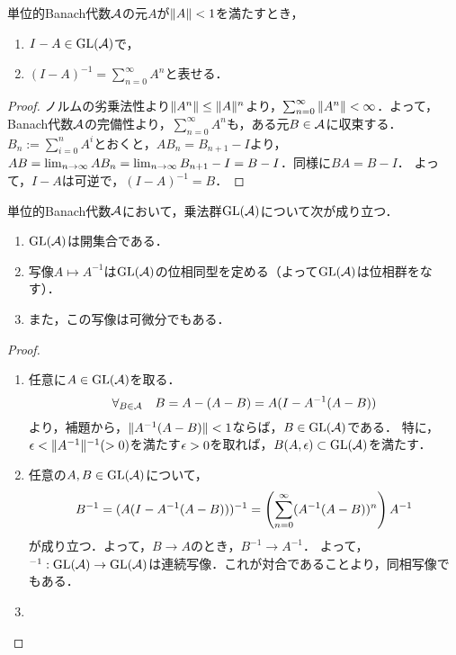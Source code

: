 \documentclass[uplatex,dvipdfmx]{jsreport}
\begin{document}
\begin{lemma}\label{lemma-Neumann-series}
    単位的Banach代数$\mathcal{A}$の元$A$が$\|A\|<1$を満たすとき，
    \begin{enumerate}
        \item $I-A\in\mathrm{GL}(\mathcal{A})$で，
        \item $(I-A)^{-1}=\sum^\infty_{n=0}A^n$と表せる．
    \end{enumerate}
\end{lemma}
\begin{proof}
    ノルムの劣乗法性より$\|A^n\|\le\|A\|^n$より，$\sum_{n=0}^\infty\|A^n\|<\infty$．よって，Banach代数$\mathcal{A}$の完備性より，$\sum_{n=0}^{\infty}A^n$も，ある元$B\in\mathcal{A}$に収束する．
    $B_n:=\sum_{i=0}^nA^i$とおくと，$AB_n=B_{n+1}-I$より，$AB=\lim_{n\to\infty}AB_n=\lim_{n\to\infty} B_{n+1}-I=B-I$．同様に$BA=B-I$．
    よって，$I-A$は可逆で，$(I-A)^{-1}=B$．
\end{proof}

\begin{proposition}\label{prop-GA-is-open-in-Banach-algebra}
    単位的Banach代数$\mathcal{A}$において，乗法群$\mathrm{GL}(\mathcal{A})$について次が成り立つ．
    \begin{enumerate}
        \item $\mathrm{GL}(\mathcal{A})$は開集合である．
        \item 写像$A\mapsto A^{-1}$は$\mathrm{GL}(\mathcal{A})$の位相同型を定める（よって$\mathrm{GL}(\mathcal{A})$は位相群をなす）．
        \item また，この写像は可微分でもある．
    \end{enumerate}
\end{proposition}
\begin{proof}\mbox{}
    \begin{enumerate}
        \item 任意に$A\in\mathrm{GL}(\mathcal{A})$を取る．
        \[\forall_{B\in\mathcal{A}}\quad B=A-(A-B)=A(I-A^{-1}(A-B))\]
        より，補題から，$\|A^{-1}(A-B)\|<1$ならば，$B\in\mathrm{GL}(\mathcal{A})$である．
        特に，$\epsilon<\|A^{-1}\|^{-1}(>0)$を満たす$\epsilon>0$を取れば，$B(A,\epsilon)\subset\mathrm{GL}(\mathcal{A})$を満たす．
        \item 任意の$A,B\in\mathrm{GL}(\mathcal{A})$について，
        \[B^{-1}=(A(I-A^{-1}(A-B)))^{-1}=\left(\sum^\infty_{n=0}(A^{-1}(A-B))^n\right)A^{-1}\]
        が成り立つ．よって，$B\to A$のとき，$B^{-1}\to A^{-1}$．
        よって，${}^{-1}:\mathrm{GL}(\mathcal{A})\to\mathrm{GL}(\mathcal{A})$は連続写像．これが対合であることより，同相写像でもある．
        \item \cite{Murphy}
    \end{enumerate}
\end{proof}
\end{document}
